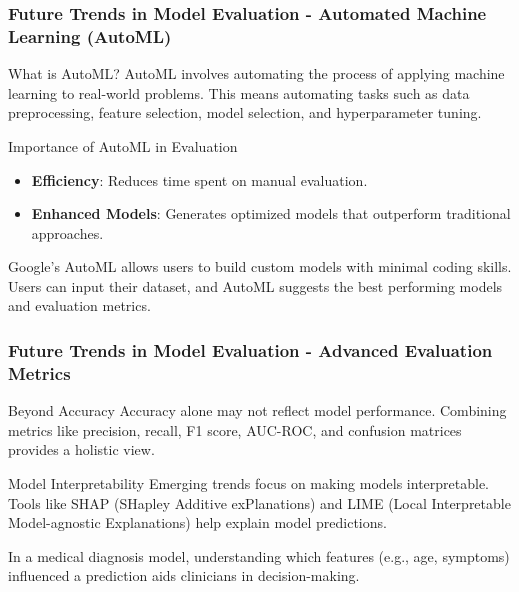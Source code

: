 \documentclass[aspectratio=169]{beamer}
\begin{document}
\begin{frame}[fragile]
    \frametitle{Future Trends in Model Evaluation - Automated Machine Learning (AutoML)}
    \begin{block}{What is AutoML?}
        AutoML involves automating the process of applying machine learning to real-world problems. This means automating tasks such as data preprocessing, feature selection, model selection, and hyperparameter tuning.
    \end{block}

    \begin{block}{Importance of AutoML in Evaluation}
        \begin{itemize}
            \item \textbf{Efficiency}: Reduces time spent on manual evaluation.
            \item \textbf{Enhanced Models}: Generates optimized models that outperform traditional approaches.
        \end{itemize}
    \end{block}

    \begin{example}
        Google’s AutoML allows users to build custom models with minimal coding skills. Users can input their dataset, and AutoML suggests the best performing models and evaluation metrics.
    \end{example}
\end{frame}

\begin{frame}[fragile]
    \frametitle{Future Trends in Model Evaluation - Advanced Evaluation Metrics}
    \begin{block}{Beyond Accuracy}
        Accuracy alone may not reflect model performance. Combining metrics like precision, recall, F1 score, AUC-ROC, and confusion matrices provides a holistic view.
    \end{block}

    \begin{block}{Model Interpretability}
        Emerging trends focus on making models interpretable. Tools like SHAP (SHapley Additive exPlanations) and LIME (Local Interpretable Model-agnostic Explanations) help explain model predictions.
    \end{block}

    \begin{example}
        In a medical diagnosis model, understanding which features (e.g., age, symptoms) influenced a prediction aids clinicians in decision-making.
    \end{example}
\end{frame}
\end{document}
